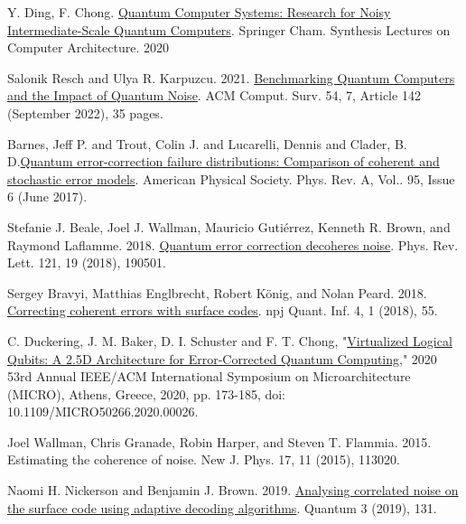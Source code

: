 \documentclass [12pt]{article}
\begin{document}
\begin{thebibliography}{1}
    Y. Ding, F. Chong. \href{https://link.springer.com/book/10.1007/978-3-031-01765-0}{Quantum Computer Systems: Research for Noisy Intermediate-Scale Quantum Computers}. Springer Cham. Synthesis Lectures on Computer Architecture. 2020

    Salonik Resch and Ulya R. Karpuzcu. 2021. \href{https://dl-acm-org.ezproxy.library.tufts.edu/doi/10.1145/3464420}{Benchmarking Quantum Computers and the Impact of Quantum Noise}. ACM Comput. Surv. 54, 7, Article 142 (September 2022), 35 pages.

    Barnes, Jeff P. and Trout, Colin J. and Lucarelli, Dennis and Clader, B. D.\href{https://arxiv.org/abs/1704.03961}{Quantum error-correction failure distributions: Comparison of coherent and stochastic error models}. American Physical Society. Phys. Rev. A, Vol.. 95, Issue 6 (June 2017).

    Stefanie J. Beale, Joel J. Wallman, Mauricio Gutiérrez, Kenneth R. Brown, and Raymond Laflamme. 2018. \href{https://link.aps.org/accepted/10.1103/PhysRevLett.121.190501}{Quantum
    error correction decoheres noise}. Phys. Rev. Lett. 121, 19 (2018), 190501.

    Sergey Bravyi, Matthias Englbrecht, Robert König, and Nolan Peard. 2018. \href{https://www.nature.com/articles/s41534-018-0106-y}{Correcting coherent errors with surface
    codes}. npj Quant. Inf. 4, 1 (2018), 55.

    C. Duckering, J. M. Baker, D. I. Schuster and F. T. Chong, "\href{https://ieeexplore-ieee-org.ezproxy.library.tufts.edu/document/9251988}{Virtualized Logical Qubits: A 2.5D Architecture for Error-Corrected Quantum Computing}," 2020 53rd Annual IEEE/ACM International Symposium on Microarchitecture (MICRO), Athens, Greece, 2020, pp. 173-185, doi: 10.1109/MICRO50266.2020.00026.

    Joel Wallman, Chris Granade, Robin Harper, and Steven T. Flammia. 2015. Estimating the coherence of noise. New J. Phys. 17, 11 (2015), 113020.

    Naomi H. Nickerson and Benjamin J. Brown. 2019. \href{https://arxiv.org/abs/1712.00502}{Analysing correlated noise on the surface code using adaptive decoding algorithms}. Quantum 3 (2019), 131.
\end{thebibliography}
\end{document}
